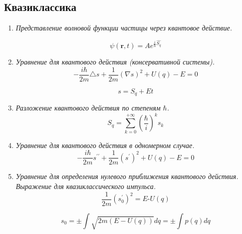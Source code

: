 \documentclass{article}
\begin{document}
{}

\subsection*{Квазиклассика}
	\begin{enumerate}
		\item \textit{Представление волновой функции частицы через квантовое действие.}

\begin{equation}
\psi(\boldsymbol{r},t)=Ae^{\frac{i}{\hbar}\hat{S_{q}}}
\end{equation}


		\item \textit{Уравнение для квантового действия (консервативной системы).}
\begin{equation}
-\frac{i\hbar}{2m}\triangle s+\frac{1}{2m}(\nabla s)^{2}+U(q)-E=0
\end{equation}


\begin{equation}
s=S_{q}+Et
\end{equation}


		\item \textit{Разложение квантового действия по степеням $\hbar$.}
\begin{equation}
S_{q}=\sum_{k=0}^{+\infty}(\frac{\hbar}{i})^{k}s_{k}
\end{equation}


		\item \textit{Уравнение для квантового действия в одномерном случае.} 
\begin{equation}
-\frac{i\hbar}{2m}s^{\prime\prime}+\frac{1}{2m}(s^{\prime})^{2}+U(q)-E=0
\end{equation}


		\item \textit{Уравнение для определения нулевого приближения квантового действия. Выражение для квазиклассического импульса.}  
\begin{equation}
\frac{1}{2m}(s_{0}^{\prime})^{2}=E\text{-}U(q)
\end{equation}


\begin{equation}
s_{0}=\pm\int\sqrt{2m(E-U(q))}dq=\pm\int p(q)dq
\end{equation}



\end{enumerate}
\end{document}
